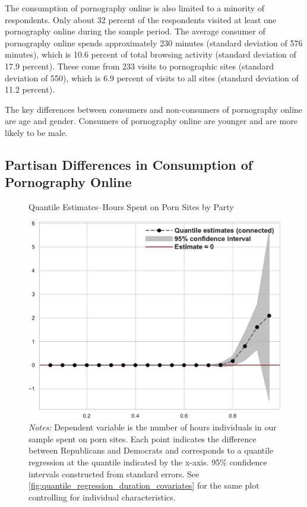 \documentclass[12pt, letterpaper]{article}
\begin{document}
The consumption of pornography online is also limited to a minority of respondents. Only about 32 percent of the respondents visited at least one pornography online during the sample period. The average consumer of pornography online spends approximately 230 minutes (standard deviation of 576 minutes), which is 10.6 percent of total browsing activity (standard deviation of 17.9 percent). These come from 233 visits to pornographic sites (standard deviation of 550), which is 6.9 percent of visits to all sites (standard deviation of 11.2 percent).

The key differences between consumers and non-consumers of pornography online are age and gender. Consumers of pornography online are younger and are more likely to be male. 


\subsection*{Partisan Differences in Consumption of Pornography Online}
\begin{figure}[t]
	\centering
	\caption{Quantile Estimates--Hours Spent on Porn Sites by Party}
	\includegraphics[width=.7\linewidth]{../figs/quantile_reg_duration_adult.pdf}
	\caption*{\footnotesize \emph{Notes:} 
		Dependent variable is the number of hours individuals in our sample spent on porn sites.
		Each point indicates the difference between Republicans and Democrats and corresponds to a quantile regression at the quantile indicated by the x-axis.
		95\% confidence intervals constructed from standard errors.
		See \cref{fig:quantile_regression_duration_covariates} for the same plot controlling for individual characteristics.
	}
	\label{fig:quantile_regression_duration}
\end{figure}
\end{document}
